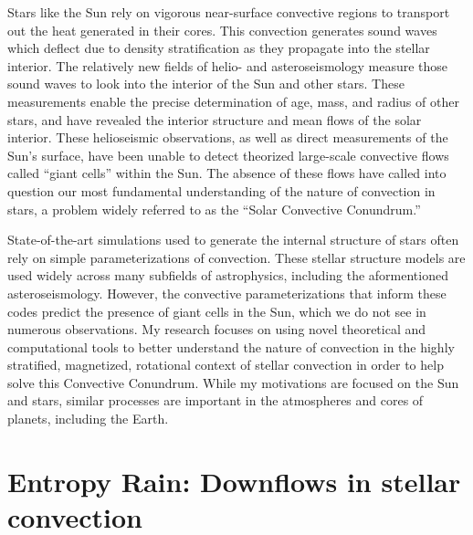 \documentclass[11pt, preprint]{aastex}
\begin{document}
Stars like the Sun rely on vigorous near-surface convective regions to transport out the heat generated in their cores.
This convection generates sound waves which deflect due to density stratification as they propagate into the stellar interior.
The relatively new fields of helio- and asteroseismology measure those sound waves to look into the interior of the Sun and other stars.
These measurements enable the precise determination of age, mass, and radius of other stars, and have revealed the interior structure and mean flows of the solar interior.
These helioseismic observations, as well as direct measurements of the Sun's surface, have been unable to detect theorized large-scale convective flows called ``giant cells'' within the Sun.
The absence of these flows have called into question our most fundamental understanding of the nature of convection in stars, a problem widely referred to as the ``Solar Convective Conundrum.''

State-of-the-art simulations used to generate the internal structure of stars often rely on simple parameterizations of convection.
These stellar structure models are used widely across many subfields of astrophysics, including the aformentioned asteroseismology.
However, the convective parameterizations that inform these codes predict the presence of giant cells in the Sun, which we do not see in numerous observations.
My research focuses on using novel theoretical and computational tools to better understand the nature of convection in the highly stratified, magnetized, rotational context of stellar convection in order to help solve this Convective Conundrum.
While my motivations are focused on the Sun and stars, similar processes are important in the atmospheres and cores of planets, including the Earth. 

\section{Entropy Rain: Downflows in stellar convection}
\vspace{-6pt}
\end{document}
